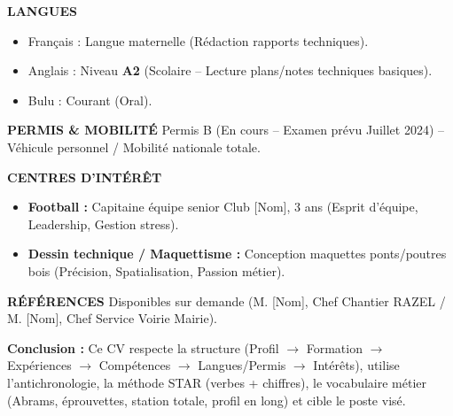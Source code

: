 \documentclass[11pt]{article}
\begin{document}
\begin{exoresolu}
\textbf{LANGUES}
\begin{itemize}
    \item Français : Langue maternelle (Rédaction rapports techniques).
    \item Anglais : Niveau \textbf{A2} (Scolaire -- Lecture plans/notes techniques basiques).
    \item Bulu : Courant (Oral).
\end{itemize}

\textbf{PERMIS \& MOBILITÉ}
Permis B (En cours -- Examen prévu Juillet 2024) -- Véhicule personnel / Mobilité nationale totale.

\textbf{CENTRES D'INTÉRÊT}
\begin{itemize}
    \item \textbf{Football :} Capitaine équipe senior Club [Nom], 3 ans (Esprit d'équipe, Leadership, Gestion stress).
    \item \textbf{Dessin technique / Maquettisme :} Conception maquettes ponts/poutres bois (Précision, Spatialisation, Passion métier).
\end{itemize}

\textbf{RÉFÉRENCES}
Disponibles sur demande (M. [Nom], Chef Chantier RAZEL / M. [Nom], Chef Service Voirie Mairie).

\vspace{1em}
\textbf{Conclusion :} Ce CV respecte la structure (Profil $\to$ Formation $\to$ Expériences $\to$ Compétences $\to$ Langues/Permis $\to$ Intérêts), utilise l'antichronologie, la méthode STAR (verbes + chiffres), le vocabulaire métier (Abrams, éprouvettes, station totale, profil en long) et cible le poste visé.
\end{exoresolu}
\end{document}
